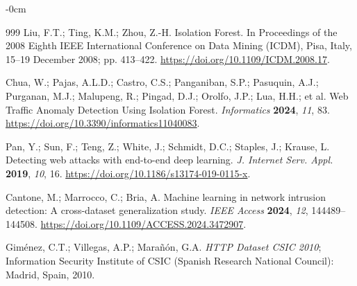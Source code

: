 \documentclass[futureinternet,article,accept,moreauthors]{Definitions/mdpi}
\begin{document}
\begin{adjustwidth}{-\extralength}{0cm}
\begin{thebibliography}{999}
Liu, F.T.; Ting, K.M.; Zhou, Z.-H. Isolation Forest. In Proceedings of the 2008 Eighth IEEE International Conference on Data Mining (ICDM), Pisa, Italy, 15--19 December 2008; pp. 413--422. \url{https://doi.org/10.1109/ICDM.2008.17}.

Chua, W.; Pajas, A.L.D.; Castro, C.S.; Panganiban, S.P.; Pasuquin, A.J.; Purganan, M.J.; Malupeng, R.; Pingad, D.J.; Orolfo, J.P.; Lua, H.H.; et al. Web Traffic Anomaly Detection Using Isolation Forest. \emph{Informatics} \textbf{2024}, \emph{11}, 83. \url{https://doi.org/10.3390/informatics11040083}.

Pan, Y.; Sun, F.; Teng, Z.; White, J.; Schmidt, D.C.; Staples, J.; Krause, L. Detecting web attacks with end-to-end deep learning. \emph{J. Internet Serv. Appl.} \textbf{2019}, \emph{10}, 16. \url{https://doi.org/10.1186/s13174-019-0115-x}.

Cantone, M.; Marrocco, C.; Bria, A. Machine learning in network intrusion detection: A cross-dataset generalization study. \emph{IEEE Access} \textbf{2024}, \emph{12}, 144489--144508. \url{https://doi.org/10.1109/ACCESS.2024.3472907}.

Gim\'{e}nez, C.T.; Villegas, A.P.; Mara\~{n}\'{o}n, G.A. \emph{HTTP Dataset CSIC 2010}; Information Security Institute of CSIC (Spanish Research National Council): Madrid, Spain, 2010.

\end{thebibliography}
\end{adjustwidth}
\end{document}
